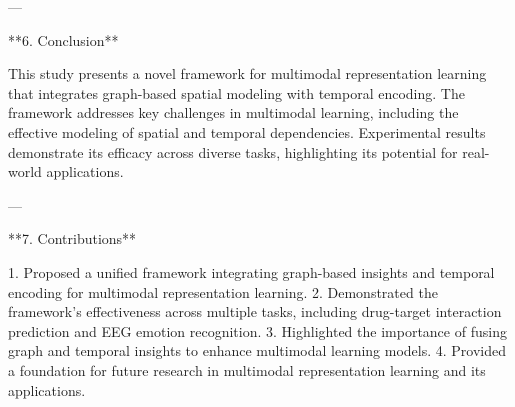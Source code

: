 ---

**6. Conclusion**

This study presents a novel framework for multimodal representation learning that integrates graph-based spatial modeling with temporal encoding. The framework addresses key challenges in multimodal learning, including the effective modeling of spatial and temporal dependencies. Experimental results demonstrate its efficacy across diverse tasks, highlighting its potential for real-world applications.

---

**7. Contributions**

1. Proposed a unified framework integrating graph-based insights and temporal encoding for multimodal representation learning.
2. Demonstrated the framework's effectiveness across multiple tasks, including drug-target interaction prediction and EEG emotion recognition.
3. Highlighted the importance of fusing graph and temporal insights to enhance multimodal learning models.
4. Provided a foundation for future research in multimodal representation learning and its applications.